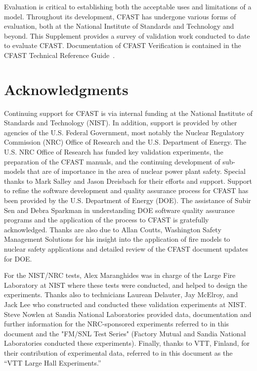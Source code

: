 \documentclass[12pt]{book}
\begin{document}
Evaluation is critical to establishing both the acceptable uses and limitations of a model. Throughout its development, CFAST has undergone various forms of evaluation, both at the National Institute of Standards and Technology and beyond. This Supplement provides a survey of validation work conducted to date to evaluate CFAST. Documentation of CFAST Verification is contained in the CFAST Technical Reference Guide~\cite{CFAST_Tech_Guide_6}.

\chapter{Acknowledgments}

\label{acksection}

Continuing support for CFAST is via internal funding at the National Institute of Standards and Technology (NIST). In addition, support is provided by other agencies of the U.S. Federal Government, most notably the Nuclear Regulatory Commission (NRC) Office of Research and the U.S. Department of Energy. The U.S. NRC Office of Research has funded key validation experiments, the preparation
of the CFAST manuals, and the continuing development of sub-models that are of importance in the area of nuclear power plant safety. Special thanks to Mark Salley and Jason Dreisbach for their efforts and support. Support to refine the software development and quality assurance process for CFAST has been provided by the U.S. Department of Energy (DOE). The assistance of Subir Sen and Debra Sparkman in understanding DOE software quality assurance programs and the application of the process to CFAST is gratefully acknowledged.  Thanks are also due to Allan Coutts, Washington Safety Management Solutions for his insight into the application of fire models to nuclear safety applications and detailed review of the CFAST document updates for DOE.

For the NIST/NRC tests, Alex Maranghides was in charge of the Large Fire Laboratory at NIST where these tests were conducted, and helped to design the experiments. Thanks also to technicians Laurean Delauter, Jay McElroy, and Jack Lee who constructed and conducted these validation experiments at NIST. Steve Nowlen at Sandia National Laboratories provided data, documentation and further information for the NRC-sponsored experiments referred to in this document and the "FM/SNL Test Series" (Factory Mutual and Sandia National Laboratories conducted these experiments). Finally, thanks to VTT, Finland, for their contribution of experimental data, referred to in this document as the ``VTT Large Hall Experiments.''
\end{document}
